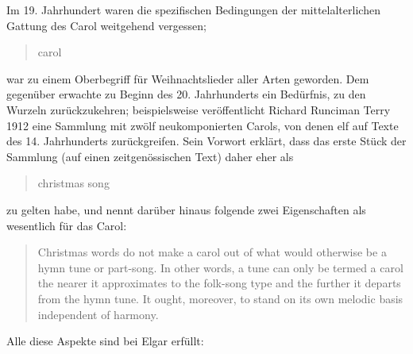 \documentclass[a4paper,11pt,open=any]{scrbook}
\newcommand{\engquote}[1]{\foreignblockquote{english}{#1}}
\begin{document}
Im 19. Jahrhundert waren die spezifischen Bedingungen der mittelalterlichen
Gattung des Carol weitgehend vergessen; \engquote{carol} war zu einem
Oberbegriff für Weihnachtslieder aller Arten geworden.  Dem gegenüber erwachte
zu Beginn des 20. Jahrhunderts ein Bedürfnis, zu den Wurzeln zurückzukehren;
beispielsweise veröffentlicht Richard Runciman Terry 1912 eine Sammlung mit
zwölf neukomponierten Carols, von denen elf auf Texte des 14. Jahrhunderts
zurückgreifen.  Sein Vorwort erklärt, dass das erste Stück der Sammlung (auf
einen zeitgenössischen Text) daher eher als \engquote{christmas song} zu
gelten habe, und nennt darüber hinaus folgende zwei Eigenschaften als
wesentlich für das Carol:

\engquote{Christmas words do not make a carol out of what would otherwise
be a hymn tune or part-song.  In other words, a tune can only be termed a
carol the nearer it approximates to the folk-song type and the further it
departs from the hymn tune.  It ought, moreover, to stand on its own melodic
basis independent of harmony.\cite[preface.]{terry}}

\noindent Alle diese Aspekte sind bei Elgar erfüllt:
\end{document}
